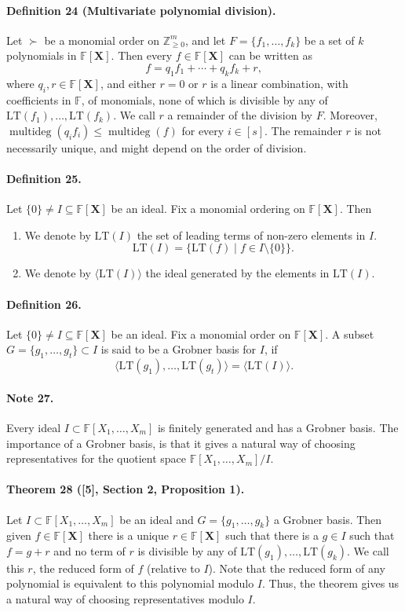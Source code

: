 \paragraph{Definition 24 (Multivariate polynomial division).} Let $\succ$ be a monomial order on $\mathbb Z_{\geq0}^m$, and let $F=\{f_1,\ldots,f_k\}$ be a set of $k$ polynomials in $\mathbb F[\boldsymbol X]$. Then every $f\in\mathbb F[\boldsymbol X]$ can be written as
\[f=q_1f_1+\cdots+q_kf_k+r,\]
where $q_i,r\in\mathbb F[\boldsymbol X]$, and either $r=0$ or $r$ is a linear combination, with coefficients in $\mathbb F$, of monomials, none of which is divisible by any of $\mathrm{LT}(f_1),\ldots,\mathrm{LT}(f_k)$. We call $r$ a remainder of the division by $F$. Moreover, $\operatorname{multideg}(q_if_i)\leq\operatorname{multideg}(f)$ for every $i\in[s]$. The remainder $r$ is not necessarily unique, and might depend on the order of division.
\paragraph{Definition 25.} Let $\{0\}\neq I\subseteq\mathbb F[\boldsymbol X]$ be an ideal. Fix a monomial ordering on $\mathbb F[\boldsymbol X]$. Then
\begin{enumerate}
\item We denote by $\mathrm{LT}(I)$ the set of leading terms of non-zero elements in $I$.
\[\mathrm{LT}(I)=\{\mathrm{LT}(f)\mid f\in I\setminus\{0\}\}.\]
\item We denote by $\langle\mathrm{LT}(I)\rangle$ the ideal generated by the elements in $\mathrm{LT}(I)$.
\end{enumerate}
\paragraph{Definition 26.} Let $\{0\}\neq I\subseteq\mathbb F[\boldsymbol X]$ be an ideal. Fix a monomial order on $\mathbb F[\boldsymbol X]$. A subset $G=\{g_1,\ldots,g_t\}\subset I$ is said to be a Grobner basis for $I$, if
\[\langle\mathrm{LT}(g_1),\ldots,\mathrm{LT}(g_t)\rangle=\langle\mathrm{LT}(I)\rangle.\]
\paragraph{Note 27.} Every ideal $I\subset\mathbb F[X_1,\ldots,X_m]$ is finitely generated and has a Grobner basis.
The importance of a Grobner basis, is that it gives a natural way of choosing representatives for the quotient space $\mathbb F[X_1,\ldots,X_m]/I$.
\paragraph{Theorem 28 ([5], Section 2, Proposition 1).} Let $I\subset\mathbb F[X_1,\ldots,X_m]$ be an ideal and $G=\{g_1,\ldots,g_k\}$ a Grobner basis. Then given $f\in\mathbb F[\boldsymbol X]$ there is a unique $r\in\mathbb F[\boldsymbol X]$ such that there is a $g\in I$ such that $f=g+r$ and no term of $r$ is divisible by any of $\mathrm{LT}(g_1),\ldots,\mathrm{LT}(g_k)$. We call this $r$, the reduced form of $f$ (relative to $I$).
Note that the reduced form of any polynomial is equivalent to this polynomial modulo $I$. Thus, the theorem gives us a natural way of choosing representatives modulo $I$.
